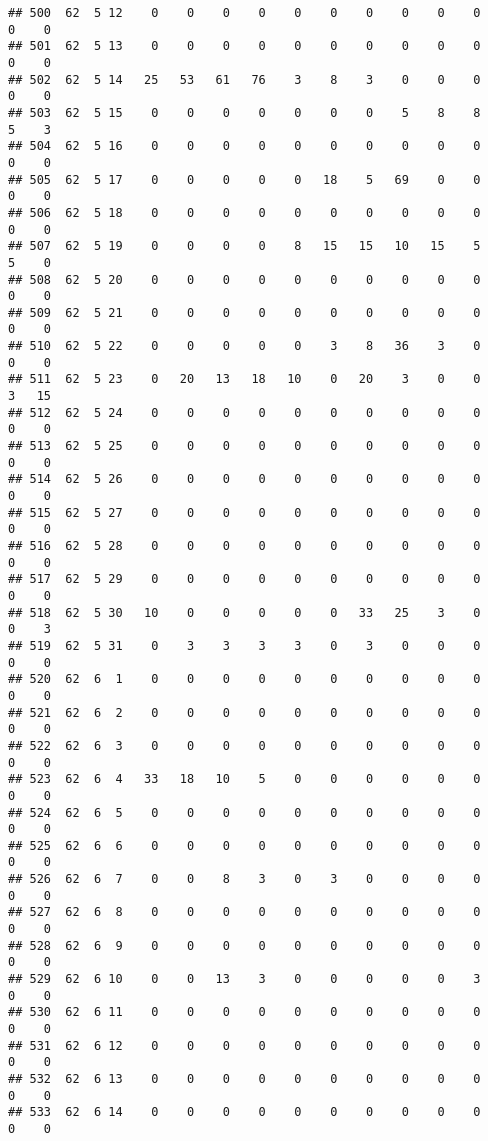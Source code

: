\documentclass[]{article}
\begin{document}
\begin{verbatim}
## 500  62  5 12    0    0    0    0    0    0    0    0    0    0    0    0
## 501  62  5 13    0    0    0    0    0    0    0    0    0    0    0    0
## 502  62  5 14   25   53   61   76    3    8    3    0    0    0    0    0
## 503  62  5 15    0    0    0    0    0    0    0    5    8    8    5    3
## 504  62  5 16    0    0    0    0    0    0    0    0    0    0    0    0
## 505  62  5 17    0    0    0    0    0   18    5   69    0    0    0    0
## 506  62  5 18    0    0    0    0    0    0    0    0    0    0    0    0
## 507  62  5 19    0    0    0    0    8   15   15   10   15    5    5    0
## 508  62  5 20    0    0    0    0    0    0    0    0    0    0    0    0
## 509  62  5 21    0    0    0    0    0    0    0    0    0    0    0    0
## 510  62  5 22    0    0    0    0    0    3    8   36    3    0    0    0
## 511  62  5 23    0   20   13   18   10    0   20    3    0    0    3   15
## 512  62  5 24    0    0    0    0    0    0    0    0    0    0    0    0
## 513  62  5 25    0    0    0    0    0    0    0    0    0    0    0    0
## 514  62  5 26    0    0    0    0    0    0    0    0    0    0    0    0
## 515  62  5 27    0    0    0    0    0    0    0    0    0    0    0    0
## 516  62  5 28    0    0    0    0    0    0    0    0    0    0    0    0
## 517  62  5 29    0    0    0    0    0    0    0    0    0    0    0    0
## 518  62  5 30   10    0    0    0    0    0   33   25    3    0    0    3
## 519  62  5 31    0    3    3    3    3    0    3    0    0    0    0    0
## 520  62  6  1    0    0    0    0    0    0    0    0    0    0    0    0
## 521  62  6  2    0    0    0    0    0    0    0    0    0    0    0    0
## 522  62  6  3    0    0    0    0    0    0    0    0    0    0    0    0
## 523  62  6  4   33   18   10    5    0    0    0    0    0    0    0    0
## 524  62  6  5    0    0    0    0    0    0    0    0    0    0    0    0
## 525  62  6  6    0    0    0    0    0    0    0    0    0    0    0    0
## 526  62  6  7    0    0    8    3    0    3    0    0    0    0    0    0
## 527  62  6  8    0    0    0    0    0    0    0    0    0    0    0    0
## 528  62  6  9    0    0    0    0    0    0    0    0    0    0    0    0
## 529  62  6 10    0    0   13    3    0    0    0    0    0    3    0    0
## 530  62  6 11    0    0    0    0    0    0    0    0    0    0    0    0
## 531  62  6 12    0    0    0    0    0    0    0    0    0    0    0    0
## 532  62  6 13    0    0    0    0    0    0    0    0    0    0    0    0
## 533  62  6 14    0    0    0    0    0    0    0    0    0    0    0    0

\end{verbatim}
\end{document}
